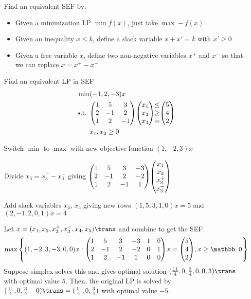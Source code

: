 Find an equivalent SEF by:

\begin{itemize}[nosep]
  \item Given a minimization LP $\min f(x)$, just take $\max -f(x)$
  \item Given an inequality $x \leq k$, define a slack variable
        $x + x' = k$ with $x' \geq 0$
  \item Given a free variable $x$, define two non-negative variables
        $x^+$ and $x^-$ so that we can replace $x = x^+ - x^-$
\end{itemize}


\begin{example}
  Find an equivalent LP in SEF
  \begin{align*}
    \min         & (-1,2,-3)x             \\
    \text{s.t. } & \mqty(1        & 5 & 3 \\2&-1&2\\1&2&-1)\mqty(x_1\\x_2\\x_3)\mqty{\leq\\\geq\\=}\mqty(5\\4\\2) \\
                 & x_1,x_2 \geq 0
  \end{align*}
\end{example}
\begin{sol}
  Switch $\min$ to $\max$ with new objective function $(1,-2,3)x$

  Divide $x_3 = x_3^+ - x_3^-$ giving $\mqty(1&5&3&-3\\2&-1&2&-2\\1&2&-1&1)\mqty(x_1\\x_2\\x_3^+\\x_3^-)$

  Add slack variables $x_4$, $x_5$ giving new rows $(1,5,3,1,0)x=5$
  and $(2,-1,2,0,1)x=4$

  Let $x = (x_1,x_2,x_3^+,x_3^-,x_4,x_5)\trans$
  and combine to get the SEF
  \[\max \qty{ (1,-2,3,-3,0,0)x : \mqty(1&5&3&-3&1&0\\2&-1&2&-2&0&1\\1&2&-1&1&0&0)x=\mqty(5\\4\\2), x \geq \mathbb 0}\]
  Suppose simplex solves this and gives optimal solution
  $(\frac{11}{4},0,\frac34,0,0,3)\trans$ with optimal value $5$. Then, the
  original LP is solved by
  $(\frac{11}{4},0,\frac34-0)\trans =(\frac{11}{4},0,\frac34)$ with optimal
  value $-5$.
\end{sol}

